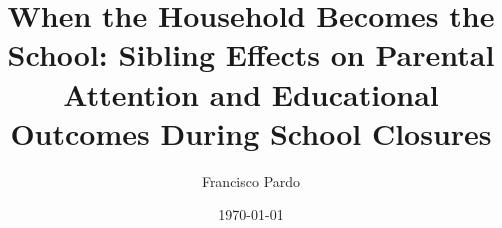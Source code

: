 
\title{When the Household Becomes the School: Sibling Effects on Parental Attention and Educational Outcomes During School Closures} %
\author{
	Francisco Pardo \\
}
\date{\today}
\JEL{}
\Keywords{}